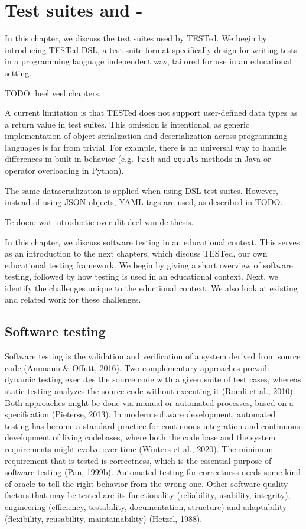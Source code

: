 \documentclass[../main]{subfiles}
\begin{document}
\chapter{Test suites and \tested-\dsl}\label{ch:test-suites-and-tested-dsl}

In this chapter, we discuss the test suites used by TESTed.
We begin by introducing TESTed-DSL, a test suite format specifically design for writing tests in a programming language independent way, tailored for use in an educational setting.

TODO: heel veel chapters.





A current limitation is that TESTed does not support user-defined data types as a return value in test suites.
This omission is intentional, as generic implementation of object serialization and deserialization across programming languages is far from trivial.
For example, there is no universal way to handle differences in built-in behavior (e.g.\ \texttt{hash} and \texttt{equals} methods in Java or operator overloading in Python).

The same dataserialization is applied when using DSL test suites.
However, instead of using JSON objects, YAML tags are used, as described in TODO.

Te doen: wat introductie over dit deel van de thesis.

In this chapter, we discuss software testing in an educational context.
This serves as an introduction to the next chapters, which discuss TESTed, our own educational testing framework.
We begin by giving a short overview of software testing, followed by how testing is used in an educational context.
Next, we identify the challenges unique to the eductional context.
We also look at existing and related work for these challenges.

\section{Software testing}
\label{sec:software-testing}

Software testing is the validation and verification of a system derived from source code (Ammann \& Offutt, 2016).
Two complementary approaches prevail: dynamic testing executes the source code with a given suite of test cases, whereas static testing analyzes the source code without executing it (Romli et al., 2010). Both approaches might be done via manual or automated processes, based on a specification (Pieterse, 2013). In modern software development, automated testing has become a standard practice for continuous integration and continuous development of living codebases, where both the code base and the system requirements might evolve over time (Winters et al., 2020). The minimum requirement that is tested is correctness, which is the essential purpose of software testing (Pan, 1999b). Automated testing for correctness needs some kind of oracle to tell the right behavior from the wrong one. Other software quality factors that may be tested are its functionality (reliability, usability, integrity), engineering (efficiency, testability, documentation, structure) and adaptability (flexibility, reusability, maintainability) (Hetzel, 1988).
\end{document}
